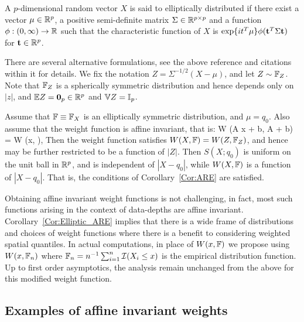 \begin{Definition}
A $p$-dimensional random vector $X$ is said to elliptically distributed if there exist a vector $\mu \in {\mathbb{R}}^p$, a positive semi-definite matrix $\Sigma \in {\mathbb{R}}^{p \times p}$ and a function 
$\phi: (0, \infty) \rightarrow {\mathbb{R}}$ such that the characteristic function of $X$ is $\exp \{ i t^{T} \mu \} \phi ({\bf{t}}^T \Sigma {\bf{t}})$ for ${\bf{t}} \in {\mathbb{R}}^p$.
\end{Definition}

There are several alternative formulations, see the above reference and 
citations within it for details. 
We fix the notation $Z = \Sigma^{-1/2} (X - \mu)$, and let 
$Z \sim {\mathbb{F}}_{Z}$. Note that ${\mathbb{F}}_{Z}$ is a spherically symmetric distribution and hence
depends only on $|z|$, and  ${\mathbb{E}} Z = \mathbf{0}_{p} \in {\mathbb{R}}^{p}$ and ${\mathbb{V}} Z = {\mathbb{I}}_{p}$.

\begin{Corollary}
\label{Cor:Elliptic_ARE}
Assume that ${\mathbb{F}} \equiv {\mathbb{F}}_X$ is an elliptically symmetric distribution, and $\mu = q_{0}$. 
Also assume that the weight function is affine invariant, that is:
\ban
W (A x + b, A \BF + b) = W (x, \BF),
\ean
Then  the weight function satisfies $W (X, {\mathbb{F}}) = W (Z, {\mathbb{F}}_{Z})$, and 
hence may be further restricted to be a function of $|Z|$. Then 
$S (X; q_{0})$ is uniform on the unit ball 
in ${\mathbb{R}}^{p}$, and is independent of $|X - q_{0}|$, while 
$W (X, {\mathbb{F}})$ is a function of  $|X - q_{0}|$. That is, the conditions of 
Corollary~\ref{Cor:ARE} are satisfied. 
\end{Corollary}

Obtaining affine invariant weight functions is not challenging, in fact, most 
such functions arising in the context of data-depths are affine invariant. 
Corollary~\ref{Cor:Elliptic_ARE} implies that there is a wide frame of distributions and 
choices of weight functions where there is a benefit to considering weighted spatial 
quantiles. In actual computations, in place of $W (x, {\mathbb{F}})$ we propose 
using $W (x, {\mathbb{F}}_{n})$ where 
${\mathbb{F}}_{n} = n^{-1} \sum_{i = 1}^{n} \mathcal{I} (X_{i} \leq x )$ is the empirical distribution 
function. Up to first order asymptotics, the analysis remain unchanged from the above 
for this modified weight function.

\subsection{Examples of affine invariant weights}


